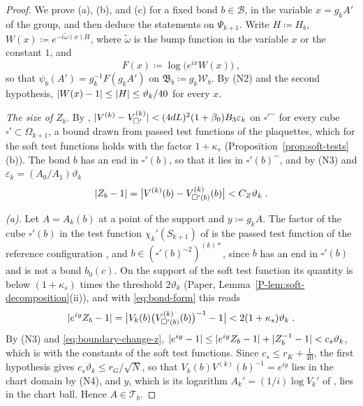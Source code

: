 \documentclass[11pt]{preprint}
\DeclarePairedDelimiter{\abs}{\lvert}{\rvert}
\numberwithin{equation}{section}
\theoremstyle{definition}
\theoremstyle{remark}
\theoremstyle{plain}
\begin{document}
\begin{proof}
We prove (a), (b), and (c) for a fixed bond $b \in \mathcal B$, in the variable $x = g_kA'$ of the group, and then deduce the statements on $\Psi_{k+1}$. Write $H \coloneqq H_b$, $W(x) \coloneqq e^{-i\tilde\omega(x)H}$, where $\tilde\omega$ is the bump function in the variable $x$ or the constant $1$, and
\[
    F(x) \coloneqq \log\bigl(e^{ix}W(x)\bigr)\;,
\]
so that $\psi_b(A') = g_k^{-1}F(g_kA')$ on $\mathfrak B_b \coloneqq g_k\mathcal W_b$. By (N2) and the second hypothesis, $\abs{W(x) - 1} \leq \abs H \leq \vartheta_k/40$ for every $x$.

\emph{The size of $Z_b$.} By \cite[(3.13), p.~267]{BalabanCRE}, $\abs{V^{(k)} - V^{(k)}_{\square'}} < (4dL)^2(1 + \beta_0)B_3\varepsilon_k$ on $\square'^{\sim}$ for every cube $\square' \subset \Omega_{k+1}$, a bound drawn from passed test functions of the plaquettes, which for the soft test functions holds with the factor $1 + \kappa_s$ (Proposition~\ref{prop:soft-tests}(b)). The bond $b$ has an end in $\square'(b)$, so that it lies in $\square'(b)^{\sim}$, and by (N3) and $\varepsilon_k = (A_0/A_1)\vartheta_k$
\begin{equation}\label{eq:boundary-change-z}
    \abs{Z_b - 1} = \bigl\lvert V^{(k)}(b) - V^{(k)}_{\square'(b)}(b)\bigr\rvert < C_Z\vartheta_k\;.
\end{equation}

\emph{(a).} Let $A = A_k(b)$ at a point of the support and $y \coloneqq g_kA$. The factor of the cube $\square'(b)$ in the test function $\chi_k'(S_{k+1})$ of \cite[(3.21), p.~269]{BalabanCRE} is the passed test function of the reference configuration \cite[(3.3), p.~265]{BalabanCRE}, and $b \in (\square'(b)^{\sim2})^{(k)*}$, since $b$ has an end in $\square'(b)$ and is not a bond $b_0(c)$. On the support of the soft test function its quantity is below $(1 + \kappa_s)$ times the threshold $2\vartheta_k$ (Paper, Lemma~\ref{P-lem:soft-decomposition}(ii)), and with \eqref{eq:bond-form} this reads
\[
    \abs{e^{iy}Z_b - 1} = \bigl\lvert V_k(b)\bigl(V^{(k)}_{\square'(b)}(b)\bigr)^{-1} - 1\bigr\rvert < 2(1 + \kappa_s)\vartheta_k\;.
\]
By (N3) and \eqref{eq:boundary-change-z}, $\abs{e^{iy} - 1} \leq \abs{e^{iy}Z_b - 1} + \abs{Z_b^{-1} - 1} < c_s\vartheta_k$, which is \cite[(3.14), p.~267]{BalabanCRE} with the constants of the soft test functions. Since $c_s \leq r_K + \frac{1}{40}$, the first hypothesis gives $c_s\vartheta_k \leq r_G/\sqrt N$, so that $V_k(b)V^{(k)}(b)^{-1} = e^{iy}$ lies in the chart domain by (N4), and $y$, which is its logarithm $A_k' = (1/i)\log V_k'$ of \cite[p.~267]{BalabanCRE}, lies in the chart ball. Hence $A \in \mathcal T_b$.


\end{proof}
\end{document}
